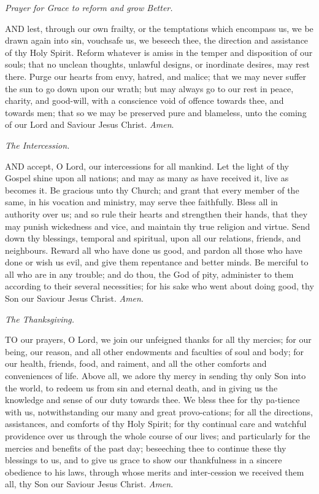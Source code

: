 \emph{Prayer
for Grace to reform and grow Better.}

AND
lest, through our own frailty, or the temptations which encompass us,
we be drawn again into sin, vouchsafe us, we beseech thee, the direction
and assistance of thy Holy Spirit. Reform whatever is amiss in the temper
and disposition of our souls; that no unclean thoughts, unlawful designs,
or inordinate desires, may rest there. Purge our hearts from envy, hatred,
and malice; that we may never suffer the sun to go down upon our wrath;
but may always go to our rest in peace, charity, and good-will, with a
conscience void of offence towards thee, and towards men; that so we may
be preserved pure and blameless, unto the coming of our Lord and Saviour
Jesus Christ. \emph{Amen}.

\emph{The
Intercession.}

AND
accept, O Lord, our intercessions for all mankind. Let the light of thy
Gospel shine upon all nations; and may as many as have received it, live
as becomes it. Be gracious unto thy Church; and grant that every member
of the same, in his vocation and ministry, may serve thee faithfully.
Bless all in authority over us; and so rule their hearts and strengthen
their hands, that they may punish wickedness and vice, and maintain thy
true religion and virtue. Send down thy blessings, temporal and spiritual,
upon all our relations, friends, and neighbours. Reward all who have done
us good, and pardon all those who have done or wish us evil, and give
them repentance and better minds. Be merciful to all who are in any trouble;
and do thou, the God of pity, administer to them according to their several
necessities; for his sake who went about doing good, thy Son our Saviour
Jesus Christ. \emph{Amen}.

\emph{The
Thanksgiving.}

TO
our prayers, O Lord, we join our unfeigned thanks for all thy mercies;
for our being, our reason, and all other endowments and faculties of soul
and body; for our health, friends, food, and raiment, and all the other
comforts and conveniences of life. Above all, we adore thy mercy in sending
thy only Son into the world, to redeem us from sin and eternal death,
and in giving us the knowledge and sense of our duty towards thee. We
bless thee for thy pa-tience with us, notwithstanding our many and great
provo-cations; for all the directions, assistances, and comforts of thy
Holy Spirit; for thy continual care and watchful providence over us through
the whole course of our lives; and particularly for the mercies and benefits
of the past day; beseeching thee to continue these thy blessings to us,
and to give us grace to show our thankfulness in a sincere obedience to
his laws, through whose merits and inter-cession we received them all,
thy Son our Saviour Jesus Christ. \emph{Amen}.


